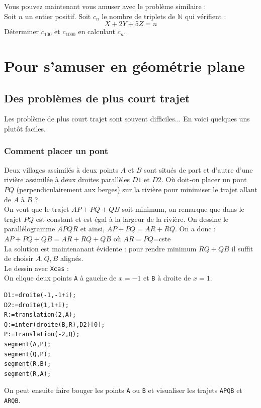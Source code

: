 \documentclass[a4paper,11pt]{book}
\begin{document}
Vous pouvez maintenant vous amuser avec  le probl\`eme similaire :\\ 
Soit $n$ un entier positif. Soit $c_n$ le nombre de triplets de $\mathbb N$
 qui v\'erifient :
$$X+2Y+5Z=n$$
D\'eterminer $c_{100}$ et $c_{1000}$ en calculant $c_n$.

\chapter{Pour s'amuser en g\'eom\'etrie plane}
\section{Des probl\`emes de plus court trajet}
Les probl\`eme de plus court trajet sont souvent difficiles...
En voici quelques uns plut\^ot faciles.  
\subsection{Comment placer un pont}
Deux villages assimil\'es \`a deux points $A$ et $B$ sont situ\'es de part et 
d'autre d'une rivi\`ere assimil\'ee \`a deux droites parall\`eles $D1$ et $D2$.
O\`u doit-on placer un pont $PQ$ (perpendiculairement aux berges) sur la 
rivi\`ere pour minimiser le trajet allant de $A$ \`a $B$ ?\\
On veut que le trajet $AP+PQ+QB$ soit minimum, on remarque que dans le trajet 
$PQ$ est constant et est \'egal \`a la largeur de la rivi\`ere. On 
dessine le parall\'elogramme $APQR$ et ainsi, $AP+PQ=AR+RQ$. 
On a donc :\\ 
$AP+PQ+QB= AR+RQ+QB$ o\`u $AR=PQ$=cste\\
La solution est maintenanant \'evidente : pour rendre minimum $RQ+QB$ il suffit 
de choisir $A,Q,B$ align\'es.\\
Le dessin avec {\tt Xcas} :\\
On clique deux points {\tt A} \`a gauche de $x=-1$ et {\tt B} \`a droite 
de $x=1$.
\begin{verbatim}
D1:=droite(-1,-1+i);
D2:=droite(1,1+i);
R:=translation(2,A);
Q:=inter(droite(B,R),D2)[0];
P:=translation(-2,Q);
segment(A,P);
segment(Q,P);
segment(R,B);
segment(R,A);
\end{verbatim}
On peut ensuite faire bouger les points {\tt A} ou {\tt B} et visualiser les 
trajets {\tt APQB} et {\tt ARQB}.  
\end{document}
